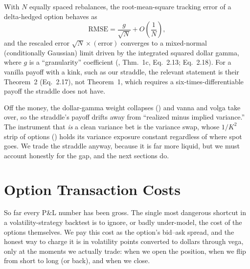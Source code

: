 \begin{keyidea}
With $N$ equally spaced rebalances, the root-mean-square tracking error of a delta-hedged option behaves as
\begin{equation}
\label{eq:ivrv:bkl-rmse}
\text{RMSE} = \frac{g}{\sqrt{N}} + O\!\left(\frac{1}{N}\right),
\end{equation}
and the rescaled error $\sqrt{N}\times(\text{error})$ converges to a mixed-normal (conditionally Gaussian) limit driven by the integrated squared dollar gamma, where $g$ is a ``granularity'' coefficient (\citealp{BertsimasKoganLo2000}, Thm.~1c, Eq.~2.13; Eq.~2.18). For a vanilla payoff with a kink, such as our straddle, the relevant statement is their Theorem~2 (Eq.~2.17), not Theorem~1, which requires a six-times-differentiable payoff the straddle does not have.
\end{keyidea}

\begin{warning}
Off the money, the dollar-gamma weight collapses () and vanna and volga take over, so the straddle's payoff drifts away from ``realized minus implied variance.'' The instrument that \emph{is} a clean variance bet is the variance swap, whose $1/K^2$ strip of options () holds its variance exposure constant regardless of where spot goes. We trade the straddle anyway, because it is far more liquid, but we must account honestly for the gap, and the next sections do.
\end{warning}

\section{Option Transaction Costs}
\label{sec:ivrv:option-costs}

So far every P\&L number has been gross. The single most dangerous shortcut in a volatility-strategy backtest is to ignore, or badly under-model, the cost of the options themselves. We pay this cost as the option's bid--ask spread, and the honest way to charge it is in volatility points converted to dollars through vega, only at the moments we actually trade: when we open the position, when we flip from short to long (or back), and when we close.

